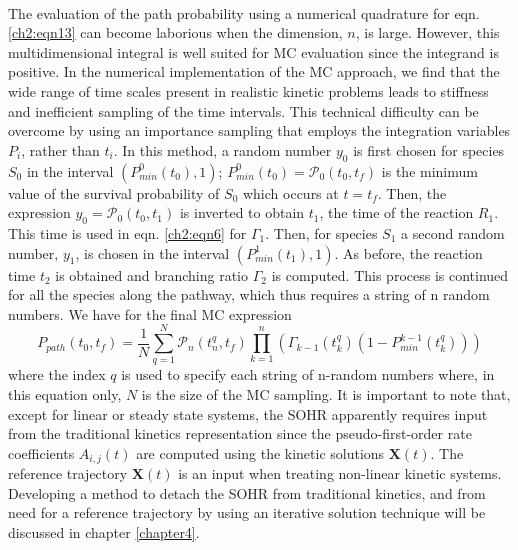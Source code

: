\paragraph{}
The evaluation of the path probability using a numerical quadrature for eqn. \ref{ch2:eqn13} can become laborious when the dimension, $n$, is large. However, this multidimensional
integral is well suited for MC evaluation since the integrand is positive. In
the numerical implementation of the MC approach, we find that the wide range of time
scales present in realistic kinetic problems leads to stiffness and inefficient sampling of
the time intervals. This technical difficulty can be overcome by using an importance
sampling that employs the integration variables $P_i$, rather than $t_i$. In this method, a random
number $y_0$ is first chosen for species $S_0$ in the interval $\left(P_{min}^{0}(t_0),1\right)$; $P_{min}^{0}(t_0) = \mathcal{P}_0(t_0, t_f)$ is the minimum value of the survival probability of $S_0$ which
occurs at $t = t_f$. Then, the expression $y_0=\mathcal{P}_0(t_0,t_1)$ is inverted to obtain $t_1$, the time of
the reaction $R_1$. This time is used in eqn. \ref{ch2:eqn6} for $\Gamma_{1}$. Then, for species $S_1$ a second
random number, $y_1$, is chosen in the interval $\left(P_{min}^{1}(t_1),1\right)$. As before, the reaction
time $t_2$ is obtained and branching ratio $\Gamma_2$ is computed. This process is continued for
all the species along the pathway, which thus requires a string of n random numbers.
We have for the final MC expression
\begin{equation}
\label{ch2:eqn14}
P_{path}(t_0,t_f)= \frac{1}{N} \sum_{q=1}^{N} {\mathcal{P}_n(t_n^q, t_f) \prod_{k=1}^{n} \left( \Gamma_{k-1}(t_k^{q})\left( 1-P_{min}^{k-1}(t_k^q)\right)  \right) }
\end{equation}
where the index $q$ is used to specify each string of n-random numbers where, in this
equation only, $N$ is the size of the MC sampling. It is important to note that, except for
linear or steady state systems, the SOHR apparently requires input from the traditional
kinetics representation since the pseudo-first-order rate coefficients $A_{i,j}(t)$ are computed
using the kinetic solutions $\mathbf{X}(t)$. The reference trajectory $\mathbf{X}(t)$ is an input when treating
non-linear kinetic systems. Developing a method to detach the SOHR from traditional
kinetics, and from need for a reference trajectory by using an iterative solution technique will be discussed in chapter \ref{chapter4}.\cite{ch1_IRPC_18_bai2017simulating}

